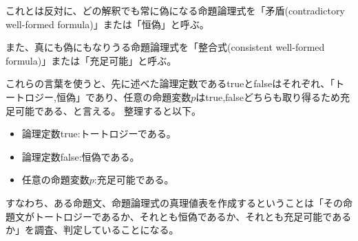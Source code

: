 \documentclass[dvipdfmx]{jsarticle}
\begin{document}
これとは反対に、どの解釈でも常に偽になる命題論理式を「矛盾(contradictory well-formed formula)」または「恒偽」と呼ぶ。\par
また、真にも偽にもなりうる命題論理式を「整合式(consistent well-formed formula)」または「充足可能」と呼ぶ。\par
これらの言葉を使うと、先に述べた論理定数であるtrueとfalseはそれぞれ、「トートロジー,恒偽」であり、任意の命題変数$p$はtrue,falseどちらも取り得るため充足可能である、と言える。
整理すると以下。
\begin{itemize}
  \item 論理定数true:トートロジーである。
  \item 論理定数false:恒偽である。
  \item 任意の命題変数$p$:充足可能である。
\end{itemize}
すなわち、ある命題文、命題論理式の真理値表を作成するということは「その命題文がトートロジーであるか、それとも恒偽であるか、それとも充足可能であるか」を調査、判定していることになる。
\end{document}
